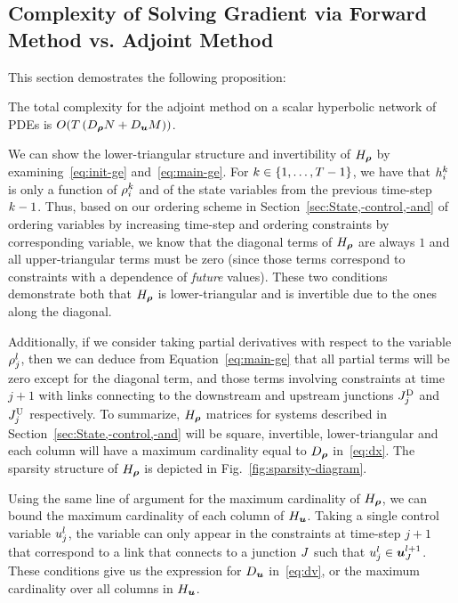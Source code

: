 \subsection{Complexity of Solving Gradient via Forward Method vs. Adjoint Method\label{sub:Complexity-of-solving}}

This section demostrates the following proposition:

\begin{prop}
\textup{The total complexity for the adjoint method on a scalar hyperbolic
network of PDEs is }$O(\ntime\left(\degree{\state}\nlinks+\degree{\control}\ncontrols\right))$.\end{prop}

We can show the lower-triangular structure and invertibility of $\Hx$
by examining~\eqref{eq:init-ge} and~\eqref{eq:main-ge}. For $k\in\left\{ 1,\ldots,T-1\right\}$,
we have that $h_{i}^{k}$ is only a function of $\rho_{i}^{k}$
and of the state variables from the previous time-step $k-1$.
Thus, based on our ordering scheme in Section~\ref{sec:State,-control,-and}
of ordering variables by increasing time-step and ordering constraints
by corresponding variable, we know that the diagonal terms of $\Hx$ are
always $1$ and all upper-triangular terms must be zero (since those
terms correspond to constraints with a dependence of \emph{future}
values). These two conditions demonstrate both that $\Hx$ is lower-triangular
and is invertible due to the ones along the diagonal.

Additionally, if we consider taking partial derivatives with respect
to the variable $\rho_{j}^{l}$, then we can deduce from Equation~\eqref{eq:main-ge}
that all partial terms will be zero except for the diagonal term,
and those terms involving constraints at time $j+1$ with links connecting
to the downstream and upstream junctions $J_{j}^{\text{D}}$ and $J_{j}^{\text{U}}$
respectively. To summarize, $\Hx$ matrices for systems described
in Section~\ref{sec:State,-control,-and} will be square, invertible,
lower-triangular and each column will have a maximum cardinality equal
to $\degree{\state}$ in~\eqref{eq:dx}. The sparsity structure of
$\Hx$ is depicted in Fig.~\ref{fig:sparsity-diagram}.

Using the same line of argument for the maximum cardinality of $\Hx$,
we can bound the maximum cardinality of each column of $\Hu$. Taking
a single control variable $u_{j}^{l}$, the variable can only
appear in the constraints at time-step $j+1$ that correspond to a link
that connects to a junction $J$ such that $\condiscrete jl\in\junccon{\jn}{l+1}$.
These conditions give us the expression for $\degree{\control}$ in~\eqref{eq:dv},
or the maximum cardinality over all columns in $\Hu$.

